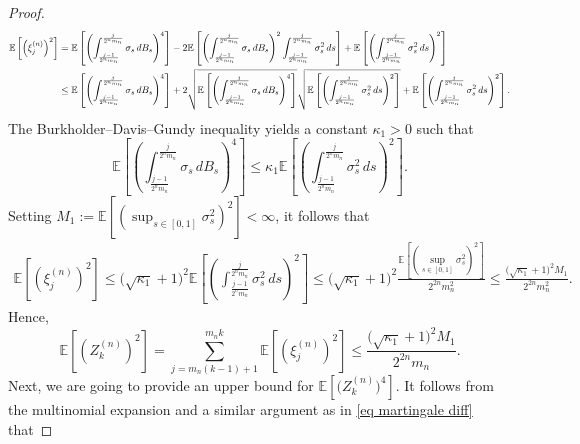 \documentclass[12pt,reqno]{article}
\newcommand\scalemath[2]{\scalebox{#1}{\mbox{\ensuremath{\displaystyle #2}}}}
\numberwithin{equation}{section}
\theoremstyle{definition}
\newcommand{\bE}{\mathbb{E}}
\begin{document}
\begin{proof}
	\begin{equation*}
		\scalemath{0.85}{\begin{split}
				\bE\left[\left(\xi^{(n)}_{j}\right)^2\right] &= \bE\left[\left(\int^{\frac{j}{2^n m_n}}_{\frac{j-1}{2^n m_n}}\sigma_s\,dB_s\right)^4\right] - 2\bE\left[\left(\int^{\frac{j}{2^n m_n}}_{\frac{j-1}{2^n m_n}}\sigma_s\,dB_s\right)^2\int^{\frac{j}{2^n m_n}}_{\frac{j-1}{2^n m_n}}\sigma^2_s\,ds\right] + \bE\left[\left(\int^{\frac{j}{2^n m_n}}_{\frac{j-1}{2^n m_n}}\sigma^2_s\,ds\right)^2\right] \\&\le \bE\left[\left(\int^{\frac{j}{2^n m_n}}_{\frac{j-1}{2^n m_n}}\sigma_s\,dB_s\right)^4\right] + 2\sqrt{\bE\left[\left(\int^{\frac{j}{2^n m_n}}_{\frac{j-1}{2^n m_n}}\sigma_s\,dB_s\right)^4\right]}\sqrt{\bE\left[\left(\int^{\frac{j}{2^n m_n}}_{\frac{j-1}{2^n m_n}}\sigma^2_s\,ds\right)^2\right]}+ \bE\left[\left(\int^{\frac{j}{2^n m_n}}_{\frac{j-1}{2^n m_n}}\sigma^2_s\,ds\right)^2\right].
		\end{split}}
	\end{equation*}
	The Burkholder--Davis--Gundy inequality yields  a constant $\kappa_1 > 0$ such that 
	\begin{equation*}
		\bE\left[\left(\int^{\frac{j}{2^n m_n}}_{\frac{j-1}{2^n m_n}}\sigma_s\,dB_s\right)^4\right] \le \kappa_1 \bE\left[\left(\int^{\frac{j}{2^n m_n}}_{\frac{j-1}{2^n m_n}}\sigma^2_s\,ds\right)^2\right].
	\end{equation*}
	Setting $M_1 := \bE\left[\left(\sup_{s \in [0,1]} \sigma^2_s \right)^2 \right] < \infty$, it follows that 
	\begin{equation*}
		\begin{split}
			\bE\left[\left(\xi^{(n)}_{j}\right)^2\right] \le \big(\sqrt{\kappa_1} + 1\big)^2\bE\left[\left(\int^{\frac{j}{2^n m_n}}_{\frac{j-1}{2^n m_n}}\sigma^2_s\,ds\right)^2\right]\le \big(\sqrt{\kappa_1} + 1\big)^2 \frac{\bE\left[\left(\sup_{s \in [0,1]}\sigma_s^2\right)^2\right]}{2^{2n}m_n^2} \le \frac{\big(\sqrt{\kappa_1} + 1\big)^2 M_1}{2^{2n}m_n^2}.
		\end{split}
	\end{equation*}
	Hence,
	\begin{equation*}
		\bE\left[\left(Z^{(n)}_{k}\right)^2\right] = \sum_{j = m_n(k-1)+1}^{m_n k}\bE\left[\left(\xi^{(n)}_{j}\right)^2\right] \le  \frac{\big(\sqrt{\kappa_1} + 1\big)^2 M_1}{2^{2n}m_n}.
	\end{equation*}
	Next, we are going to provide an upper bound for $\bE\left[\big(Z^{(n)}_{k}\big)^4\right]$. It follows from the multinomial expansion and a similar argument as in \eqref{eq martingale diff} that

\end{proof}
\end{document}
